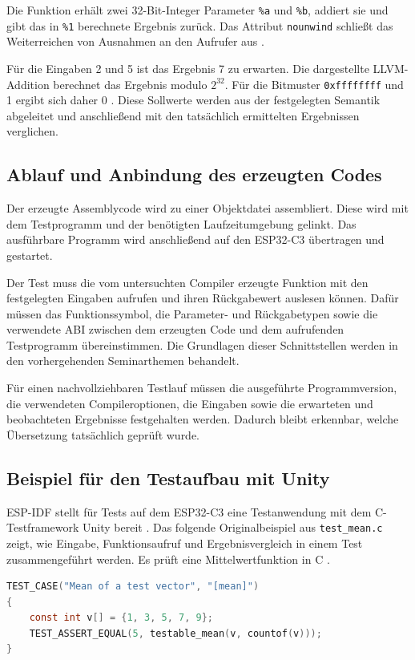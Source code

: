 \documentclass[11pt,a4paper]{article}
\newcommand{\code}[1]{\texttt{#1}}
\begin{document}
Die Funktion erhält zwei 32-Bit-Integer Parameter \code{\%a} und \code{\%b}, addiert sie und gibt das in \code{\%1} berechnete Ergebnis zurück. Das Attribut \code{nounwind} schließt das Weiterreichen von Ausnahmen an den Aufrufer aus \cite{langref}.

Für die Eingaben 2 und 5 ist das Ergebnis 7 zu erwarten.
Die dargestellte LLVM-Addition berechnet das Ergebnis modulo
$2^{32}$. Für die Bitmuster \code{0xffffffff} und 1 ergibt sich
daher 0 \cite[Abschnitt \emph{add Instruction}]{langref}.
Diese Sollwerte werden aus der festgelegten Semantik abgeleitet
und anschließend mit den tatsächlich ermittelten Ergebnissen
verglichen.

\subsection{Ablauf und Anbindung des erzeugten Codes}
Der erzeugte Assemblycode wird zu einer Objektdatei assembliert.
Diese wird mit dem Testprogramm und der benötigten Laufzeitumgebung
gelinkt. Das ausführbare Programm wird anschließend auf den
ESP32-C3 übertragen und gestartet.

Der Test muss die vom untersuchten Compiler erzeugte Funktion
mit den festgelegten Eingaben aufrufen und ihren Rückgabewert
auslesen können. Dafür müssen das Funktionssymbol, die Parameter-
und Rückgabetypen sowie die verwendete ABI zwischen dem erzeugten
Code und dem aufrufenden Testprogramm übereinstimmen. Die Grundlagen
dieser Schnittstellen werden in den vorhergehenden Seminarthemen
behandelt.

Für einen nachvollziehbaren Testlauf müssen die ausgeführte
Programmversion, die verwendeten Compileroptionen, die Eingaben
sowie die erwarteten und beobachteten Ergebnisse festgehalten
werden. Dadurch bleibt erkennbar, welche Übersetzung tatsächlich
geprüft wurde.

\subsection{Beispiel für den Testaufbau mit Unity}
ESP-IDF stellt für Tests auf dem ESP32-C3 eine Testanwendung mit
dem C-Testframework Unity bereit \cite{esptests}. Das folgende
Originalbeispiel aus \code{test\_mean.c} zeigt, wie Eingabe,
Funktionsaufruf und Ergebnisvergleich in einem Test zusammengeführt
werden. Es prüft eine Mittelwertfunktion in C \cite{espmean}.

\par\noindent\begin{minipage}{\linewidth}
\begin{lstlisting}[language=C,caption={Originaltest aus dem ESP-IDF-Beispiel test\_mean.c}]
TEST_CASE("Mean of a test vector", "[mean]")
{
    const int v[] = {1, 3, 5, 7, 9};
    TEST_ASSERT_EQUAL(5, testable_mean(v, countof(v)));
}
\end{lstlisting}
\end{minipage}\par
\end{document}
